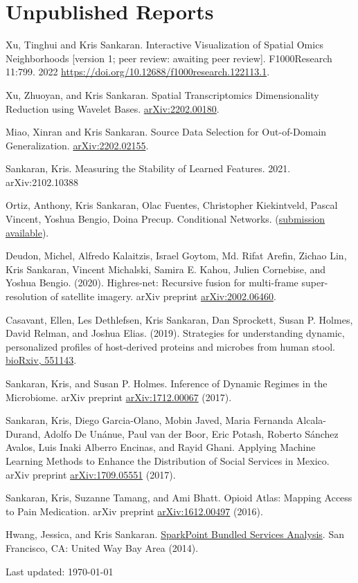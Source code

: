 \documentclass[letterpaper]{article}
\def\footerlink{}
\renewenvironment{itemize}{
  \begin{list}{}{
    \setlength{\leftmargin}{1.5em}
  }
}{
  \end{list}
}
\begin{document}
\section*{Unpublished Reports}
\begin{itemize}
\item Xu, Tinghui and Kris Sankaran. Interactive Visualization of
Spatial Omics Neighborhoods [version 1; peer review: awaiting peer review]. F1000Research 11:799. 2022
\href{https://doi.org/10.12688/f1000research.122113.1}{https://doi.org/10.12688/f1000research.122113.1}.
\item Xu, Zhuoyan, and Kris Sankaran. Spatial Transcriptomics
Dimensionality Reduction using Wavelet Bases. \href{https://arxiv.org/abs/2202.00180}{arXiv:2202.00180}.
\item Miao, Xinran and Kris Sankaran. Source Data Selection for
Out-of-Domain Generalization.
\href{https://arxiv.org/abs/2202.02155}{arXiv:2202.02155}.
\item Sankaran, Kris. Measuring the Stability of Learned Features. 2021.
arXiv:2102.10388
\item Ortiz, Anthony, Kris Sankaran, Olac Fuentes, Christopher Kiekintveld,
  Pascal Vincent, Yoshua Bengio, Doina Precup. Conditional Networks. (\href{https://openreview.net/forum?id=h8q8iZi-ks}{submission
    available}).
\item Deudon, Michel, Alfredo Kalaitzis, Israel Goytom, Md. Rifat Arefin, Zichao
  Lin, Kris Sankaran, Vincent Michalski, Samira E. Kahou, Julien Cornebise, and
  Yoshua Bengio. (2020). Highres-net: Recursive fusion for multi-frame
  super-resolution of satellite imagery. arXiv preprint
  \href{https://arxiv.org/abs/2002.06460}{arXiv:2002.06460}.
\item Casavant, Ellen, Les Dethlefsen, Kris Sankaran, Dan Sprockett, Susan P.
  Holmes, David Relman, and Joshua Elias. (2019). Strategies for understanding
  dynamic, personalized profiles of host-derived proteins and microbes from
  human stool. \href{https://www.biorxiv.org/content/10.1101/551143v1}{bioRxiv, 551143}.
 \item Sankaran, Kris, and Susan P. Holmes. Inference of Dynamic Regimes in the
   Microbiome. arXiv preprint \href{https://arxiv.org/abs/1712.00067}{arXiv:1712.00067} (2017).
\item Sankaran, Kris, Diego Garcia-Olano, Mobin Javed, Maria Fernanda
  Alcala-Durand, Adolfo De Unánue, Paul van der Boor, Eric Potash, Roberto
  S\'anchez Avalos, Luis Inaki Alberro Encinas, and Rayid Ghani. Applying
  Machine Learning Methods to Enhance the Distribution of Social Services in
  Mexico. arXiv preprint \href{https://arxiv.org/abs/1709.05551}{arXiv:1709.05551} (2017).
\item Sankaran, Kris, Suzanne Tamang, and Ami Bhatt. Opioid Atlas: Mapping
  Access to Pain Medication. arXiv preprint
  \href{https://arxiv.org/abs/1612.00497}{arXiv:1612.00497} (2016). \item Hwang,
  Jessica, and Kris Sankaran.
\href{https://uwba.org/wp-content/uploads/2022/04/UnitedWay_BayArea_2014_SparkPoint_Bundle_Services_FINAL.pdf}{SparkPoint
Bundled Services Analysis}. San Francisco, CA: United Way Bay Area (2014).
\end{itemize}


\begin{center}
  \begin{footnotesize}
    Last updated: \today \\
    \href{\footerlink}{\texttt{\footerlink}}
  \end{footnotesize}
\end{center}
\end{document}
